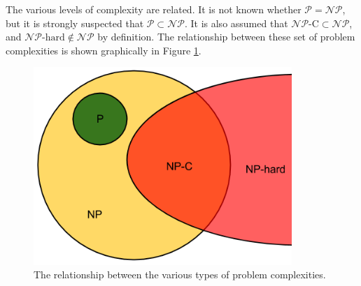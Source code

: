 The various levels of complexity are related. It is not known whether
$\mathcal{P} = \mathcal{NP}$, but it is strongly suspected that
$\mathcal{P} \subset \mathcal{NP}$. It is also assumed that
$\mathcal{NP}\text{-C} \subset \mathcal{NP}$, and
$\mathcal{NP}\text{-hard} \notin \mathcal{NP}$ by definition. The relationship
between these set of problem complexities is shown graphically in
Figure \ref{fig:complexity}.

\begin{figure}[H]
  \begin{center}
    \includegraphics[height=7.5cm]{./chapters/litreview/complexity.png}
  \caption{The relationship between the various types of problem complexities.}
  \label{fig:complexity}
  \end{center}
\end{figure}
